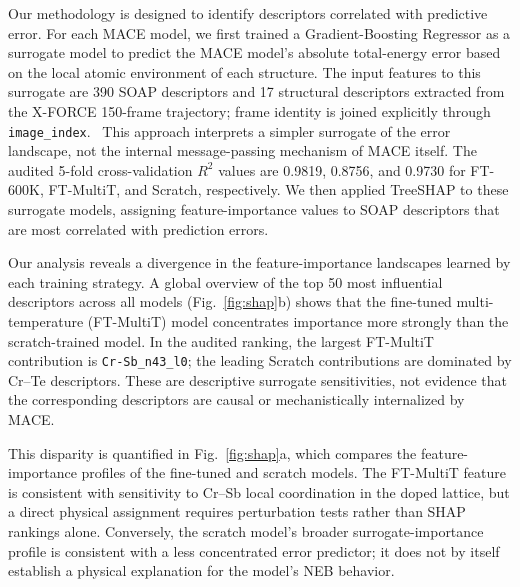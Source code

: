 \documentclass[pdflatex,sn-mathphys-num]{sn-jnl}%
\providecommand{\reviewermap}[3]{}
\theoremstyle{thmstyleone}%
\theoremstyle{thmstyletwo}%
\theoremstyle{thmstylethree}%
\begin{document}
\reviewermap{REV-A6/REV-C13}{done-local}{SHAP explains surrogate error predictions, not MACE internals directly; current 5-fold CV R2 values are 0.9819, 0.8756, and 0.9730.}
Our methodology is designed to identify descriptors correlated with predictive error. For each MACE model, we first trained a Gradient-Boosting Regressor as a surrogate model to predict the MACE model's absolute total-energy error based on the local atomic environment of each structure. The input features to this surrogate are 390 SOAP descriptors and 17 structural descriptors extracted from the X-FORCE 150-frame trajectory; frame identity is joined explicitly through \texttt{image\_index}.~\cite{bartok2012representing} This approach interprets a simpler surrogate of the error landscape, not the internal message-passing mechanism of MACE itself. The audited 5-fold cross-validation $R^2$ values are 0.9819, 0.8756, and 0.9730 for FT-600K, FT-MultiT, and Scratch, respectively. We then applied TreeSHAP to these surrogate models, assigning feature-importance values to SOAP descriptors that are most correlated with prediction errors.


Our analysis reveals a divergence in the feature-importance landscapes learned by each training strategy. A global overview of the top 50 most influential descriptors across all models (Fig.~\ref{fig:shap}b) shows that the fine-tuned multi-temperature (FT-MultiT) model concentrates importance more strongly than the scratch-trained model. In the audited ranking, the largest FT-MultiT contribution is \texttt{Cr-Sb\_n43\_l0}; the leading Scratch contributions are dominated by Cr--Te descriptors. These are descriptive surrogate sensitivities, not evidence that the corresponding descriptors are causal or mechanistically internalized by MACE.

This disparity is quantified in Fig.~\ref{fig:shap}a, which compares the feature-importance profiles of the fine-tuned and scratch models. The FT-MultiT feature is consistent with sensitivity to Cr--Sb local coordination in the doped lattice, but a direct physical assignment requires perturbation tests rather than SHAP rankings alone. Conversely, the scratch model's broader surrogate-importance profile is consistent with a less concentrated error predictor; it does not by itself establish a physical explanation for the model's NEB behavior.
\end{document}

